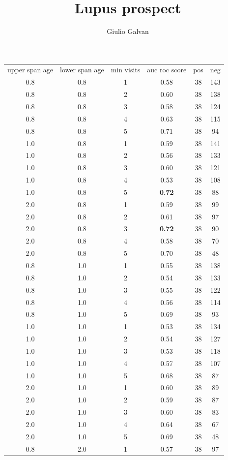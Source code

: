 \documentclass{article}
\title{Lupus prospect}
\author{Giulio Galvan}
\begin{document}
\begin{table}[!h]
	\centering
	\begin{tabular}{c  c  c | c  c c}
		upper span age & lower span age & min visits & auc roc score & pos & neg\\
		0.8 & 0.8 & 1 & 0.58 & 38 & 143\\
		0.8 & 0.8 & 2 & 0.60 & 38 & 138\\
		0.8 & 0.8 & 3 & 0.58 & 38 & 124\\
		0.8 & 0.8 & 4 & 0.63 & 38 & 115\\
		0.8 & 0.8 & 5 & 0.71 & 38 & 94\\
		1.0 & 0.8 & 1 & 0.59 & 38 & 141\\
		1.0 & 0.8 & 2 & 0.56 & 38 & 133\\
		1.0 & 0.8 & 3 & 0.60 & 38 & 121\\
		1.0 & 0.8 & 4 & 0.53 & 38 & 108\\
		1.0 & 0.8 & 5 & \textbf{0.72} & 38 & 88\\
		2.0 & 0.8 & 1 & 0.59 & 38 & 99\\
		2.0 & 0.8 & 2 & 0.61 & 38 & 97\\
		2.0 & 0.8 & 3 & \textbf{0.72} & 38 & 90\\
		2.0 & 0.8 & 4 & 0.58 & 38 & 70\\
		2.0 & 0.8 & 5 & 0.70 & 38 & 48\\
		0.8 & 1.0 & 1 & 0.55 & 38 & 138\\
		0.8 & 1.0 & 2 & 0.54 & 38 & 133\\
		0.8 & 1.0 & 3 & 0.55 & 38 & 122\\
		0.8 & 1.0 & 4 & 0.56 & 38 & 114\\
		0.8 & 1.0 & 5 & 0.69 & 38 & 93\\
		1.0 & 1.0 & 1 & 0.53 & 38 & 134\\
		1.0 & 1.0 & 2 & 0.54 & 38 & 127\\
		1.0 & 1.0 & 3 & 0.53 & 38 & 118\\
		1.0 & 1.0 & 4 & 0.57 & 38 & 107\\
		1.0 & 1.0 & 5 & 0.68 & 38 & 87\\
		2.0 & 1.0 & 1 & 0.60 & 38 & 89\\
		2.0 & 1.0 & 2 & 0.59 & 38 & 87\\
		2.0 & 1.0 & 3 & 0.60 & 38 & 83\\
		2.0 & 1.0 & 4 & 0.64 & 38 & 67\\
		2.0 & 1.0 & 5 & 0.69 & 38 & 48\\
		0.8 & 2.0 & 1 & 0.57 & 38 & 97\\

\end{tabular}
\end{table}
\end{document}

